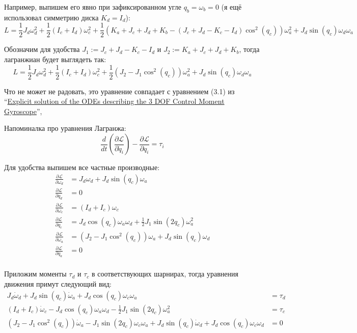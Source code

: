 \documentclass{article}
\begin{document}
Например, выпишем его явно при зафиксированном угле $q_b=\omega_b=0$ (я ещё использовал симметрию диска $K_d=I_d$):
$$
L=\frac{1}{2}J_d \omega_d^2 + \frac{1}{2}(I_c+I_d) \omega_c^2 + \frac{1}{2}\left(K_a+J_c+J_d+K_b - (J_c+J_d-K_c-I_d) \cos^2(q_c)\right) \omega_a^2 + J_d \sin(q_c) \omega_d \omega_a
$$

Обозначим для удобства $J_1:=J_c+J_d-K_c-I_d$ и $J_2:=K_a+J_c+J_d+K_b$, тогда лагранжиан будет выглядеть так:
$$
L=\frac{1}{2}J_d \omega_d^2 + \frac{1}{2}(I_c+I_d) \omega_c^2 + \frac{1}{2}\left(J_2 - J_1 \cos^2(q_c)\right) \omega_a^2 + J_d \sin(q_c) \omega_d \omega_a
$$


Что не может не радовать, это уравнение совпадает с уравнением (3.1) из ``\href{http://www.mate.tue.nl/mate/pdfs/9731.pdf}{Explicit solution of the ODEs describing the 3 DOF Control Moment Gyroscope}'',

Напоминалка про уравнения Лагранжа:
$$
\frac{d}{dt}\left(\frac{\partial\mathcal L}{\partial\dot q_i}\right) - \frac{\partial\mathcal L}{\partial q_i} = \tau_i
$$

Для удобства выпишем все частные производные:
\begin{align*}
\frac{\partial\mathcal L}{\partial\omega_d} &=  J_d \omega_d + J_d \sin(q_c) \omega_a \\
\frac{\partial\mathcal L}{\partial q_d} & =  0\\
\frac{\partial\mathcal L}{\partial\omega_c} &= (I_d+I_c)\omega_c \\
\frac{\partial\mathcal L}{\partial q_c} &= J_d \cos(q_c) \omega_a \omega_d + \frac{1}{2}J_1  \sin(2 q_c) \omega_a^2  \\
\frac{\partial\mathcal L}{\partial\omega_a}  &= \left(J_2 - J_1 \cos^2(q_c)\right) \omega_a  + J_d \sin(q_c) \omega_d \\
\frac{\partial\mathcal L}{\partial q_a}   &= 0\\
\end{align*}

Приложим моменты $\tau_d$ и $\tau_c$ в соответствующих шарнирах, тогда уравнения движения примут следующий вид:
\begin{align*}
 J_d \dot\omega_d + J_d \sin(q_c)\dot \omega_a + J_d \cos(q_c)\omega_c\omega_a &=\tau_d\\
(I_d+I_c)\dot\omega_c - J_d \cos(q_c) \omega_a \omega_d - \frac{1}{2}J_1  \sin(2 q_c) \omega_a^2  &= \tau_c \\
\left(J_2 - J_1 \cos^2(q_c)\right)\dot \omega_a - J_1 \sin(2 q_c)\omega_c\omega_a +  J_d \sin(q_c) \dot\omega_d + J_d \cos(q_c) \omega_c\omega_d &= 0\\
\end{align*}
\end{document}
